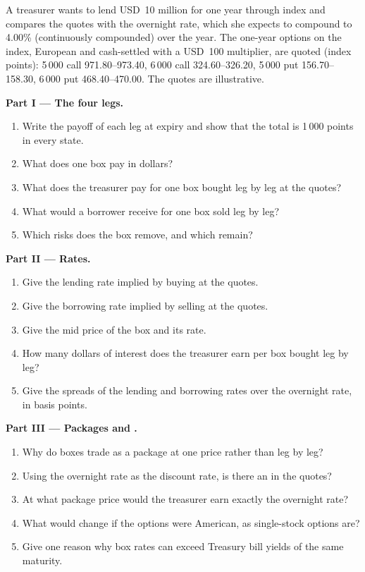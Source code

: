\begin{problem}\label{pb:dv:no-arbitrage-and-the-fundamental-theorems:1}
A treasurer wants to lend USD~10 million for one year through index 
and compares the quotes with the overnight rate, which she expects to compound
to 4.00\% (continuously compounded) over the year. The one-year options on the
index, European and cash-settled with a USD~100 multiplier, are quoted (index
points): 5\,000 call 971.80--973.40, 6\,000 call 324.60--326.20, 5\,000 put
156.70--158.30, 6\,000 put 468.40--470.00. The quotes are illustrative.

\medskip\noindent\textbf{Part I --- The four legs.}
\begin{enumerate}
\item Write the payoff of each leg at expiry and show that the total is 1\,000
points in every state.
\item What does one box pay in dollars?
\item What does the treasurer pay for one box bought leg by leg at the quotes?
\item What would a borrower receive for one box sold leg by leg?
\item Which risks does the box remove, and which remain?
\end{enumerate}

\medskip\noindent\textbf{Part II --- Rates.}
\begin{enumerate}[resume]
\item Give the lending rate implied by buying at the quotes.
\item Give the borrowing rate implied by selling at the quotes.
\item Give the mid price of the box and its rate.
\item How many dollars of interest does the treasurer earn per box bought leg by leg?
\item Give the spreads of the lending and borrowing rates over the overnight rate, in basis points.
\end{enumerate}

\medskip\noindent\textbf{Part III --- Packages and .}
\begin{enumerate}[resume]
\item Why do boxes trade as a package at one price rather than leg by leg?
\item Using the overnight rate as the discount rate, is there an  in the quotes?
\item At what package price would the treasurer earn exactly the overnight rate?
\item What would change if the options were American, as single-stock options are?
\item Give one reason why box rates can exceed Treasury bill yields of the same maturity.
\end{enumerate}


\end{problem}
